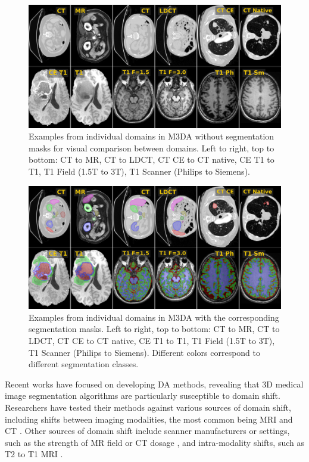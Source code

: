 \begin{figure}[h]
	\centering
	\includegraphics[width=1\linewidth]{Dissertation/Figures/4_da_bench/fig2_bench_examples.png}
	\caption{Examples from individual domains in M3DA without segmentation masks for visual comparison between domains. Left to right, top to bottom: CT to MR, CT to LDCT, CT CE to CT native, CE T1 to T1, T1 Field (1.5T to 3T), T1 Scanner (Philips to Siemens).}
	\label{fig:teaser2}
\end{figure}


\begin{figure}[h]
	\centering
	\includegraphics[width=1\linewidth]{Dissertation/Figures/4_da_bench/fig2_bench_contours.png}
	\caption{Examples from individual domains in M3DA with the corresponding segmentation masks. Left to right, top to bottom: CT to MR, CT to LDCT, CT CE to CT native, CE T1 to T1, T1 Field (1.5T to 3T), T1 Scanner (Philips to Siemens). Different colors correspond to different segmentation classes.}
	\label{fig:contours}
\end{figure}

Recent works have focused on developing DA methods, revealing that 3D medical image segmentation algorithms are particularly susceptible to domain shift. Researchers have tested their methods against various sources of domain shift, including shifts between imaging modalities, the most common being MRI and CT \cite{jiang2020unified,yu2023source,zheng2021hierarchical}. Other sources of domain shift include scanner manufacturers or settings, such as the strength of MR field or CT dosage \cite{zheng2021hierarchical,liu2020shape,chen2022maxstyle,gu2021domain,lennartz2023segmentation,se_medim}, and intra-modality shifts, such as T2 to T1 MRI \cite{han2021deep,crossmoda,dann_medim}.

